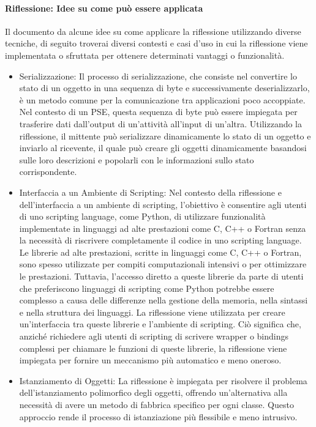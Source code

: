 \documentclass[11pt]{article}
\begin{document}
\begin{multicols*}{2}[\columnsep=1cm]
    \paragraph{Riflessione: Idee su come può essere applicata}
    Il documento da alcune idee su come applicare la riflessione utilizzando diverse tecniche, di seguito troverai diversi contesti e casi d'uso in cui la riflessione viene implementata o sfruttata per ottenere determinati vantaggi o funzionalità.
    \begin{itemize}
    \item {Serializzazione:}
    Il processo di serializzazione, che consiste nel convertire lo stato di un oggetto in una sequenza di byte e successivamente deserializzarlo, è un metodo comune per la comunicazione tra applicazioni poco accoppiate. 
    Nel contesto di un PSE, questa sequenza di byte può essere impiegata per trasferire dati dall'output di un'attività all'input di un'altra. 
    Utilizzando la riflessione, il mittente può serializzare dinamicamente lo stato di un oggetto e inviarlo al ricevente, il quale può creare gli oggetti dinamicamente basandosi sulle loro descrizioni e popolarli con le informazioni sullo stato corrispondente. 
    \item {Interfaccia a un Ambiente di Scripting:}
    Nel contesto della riflessione e dell'interfaccia a un ambiente di scripting, l'obiettivo è consentire agli utenti di uno scripting language, come Python, di utilizzare funzionalità implementate in linguaggi ad alte prestazioni come C, C++ o Fortran senza la necessità di riscrivere completamente il codice in uno scripting language.
    Le librerie ad alte prestazioni, scritte in linguaggi come C, C++ o Fortran, sono spesso utilizzate per compiti computazionali intensivi o per ottimizzare le prestazioni. Tuttavia, l'accesso diretto a queste librerie da parte di utenti che preferiscono linguaggi di scripting come Python potrebbe essere complesso a causa delle differenze nella gestione della memoria, nella sintassi e nella struttura dei linguaggi.
    La riflessione viene utilizzata per creare un'interfaccia tra queste librerie e l'ambiente di scripting. Ciò significa che, anziché richiedere agli utenti di scripting di scrivere wrapper o bindings complessi per chiamare le funzioni di queste librerie, la riflessione viene impiegata per fornire un meccanismo più automatico e meno oneroso.    
    \item {Istanziamento di Oggetti:}
    La riflessione è impiegata per risolvere il problema dell'istanziamento polimorfico degli oggetti, offrendo un'alternativa alla necessità di avere un metodo di fabbrica specifico per ogni classe. Questo approccio rende il processo di istanziazione più flessibile e meno intrusivo.

\end{itemize}
\end{multicols*}
\end{document}
